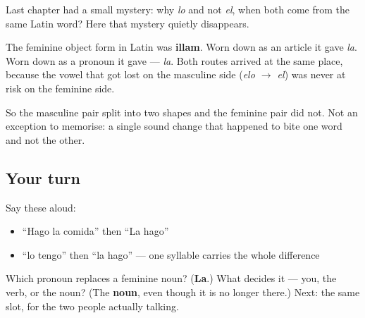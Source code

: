 \begin{cousinweb}
Last chapter had a small mystery: why \emph{lo} and not \emph{el}, when both come from the same Latin word? Here that mystery quietly disappears.

The feminine object form in Latin was \textbf{illam}. Worn down as an article it gave \emph{la}. Worn down as a pronoun it gave — \emph{la}. Both routes arrived at the same place, because the vowel that got lost on the masculine side (\emph{elo $\to$ el}) was never at risk on the feminine side.

So the masculine pair split into two shapes and the feminine pair did not. Not an exception to memorise: a single sound change that happened to bite one word and not the other.
\end{cousinweb}

\subsection*{Your turn}
Say these aloud:

\begin{itemize}
\raggedright
  \item \textquotedblleft{}Hago la comida\textquotedblright{} then \textquotedblleft{}La hago\textquotedblright{}
  \item \textquotedblleft{}lo tengo\textquotedblright{} then \textquotedblleft{}la hago\textquotedblright{} — one syllable carries the whole difference
\end{itemize}

\begin{tcolorbox}[breakable,colback=teal!4,colframe=teal!35!black,title={Before you move on}]
Which pronoun replaces a feminine noun? (\textbf{La}.) What decides it — you, the verb, or the noun? (The \textbf{noun}, even though it is no longer there.) Next: the same slot, for the two people actually talking.
\end{tcolorbox}
